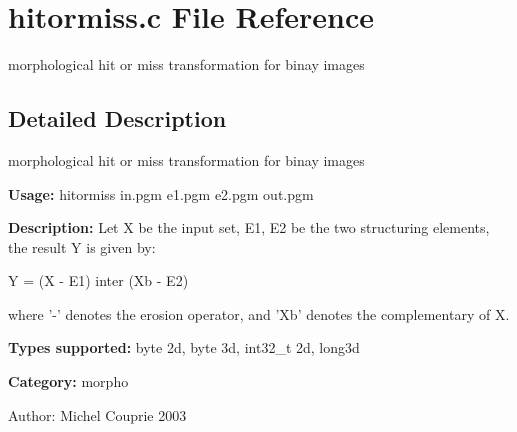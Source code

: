 \section{hitormiss.c File Reference}
\label{hitormiss_8c}
morphological hit or miss transformation for binay images 



\subsection{Detailed Description}
morphological hit or miss transformation for binay images 

{\bf Usage:} hitormiss in.pgm e1.pgm e2.pgm out.pgm

{\bf Description:} Let X be the input set, E1, E2 be the two structuring elements, the result Y is given by:\par
 Y = (X - E1) inter (Xb - E2)\par
 where '-' denotes the erosion operator, and 'Xb' denotes the complementary of X.

{\bf Types supported:} byte 2d, byte 3d, int32\_\-t 2d, long3d

{\bf Category:} morpho

\begin{Desc}
\item[Author:]Michel Couprie 2003 \end{Desc}
